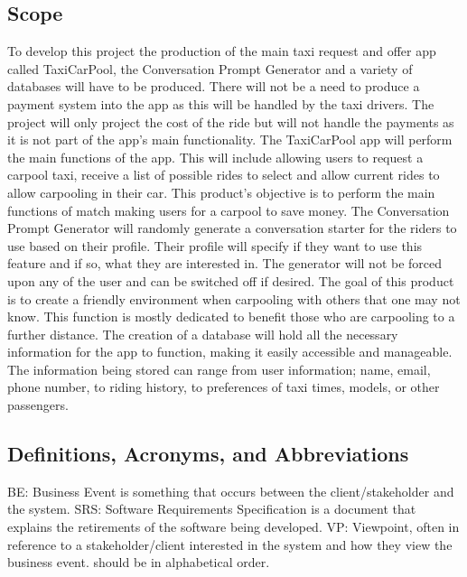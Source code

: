 \documentclass[]{article}
\begin{document}
\subsection{Scope}
\label{sub:scope}
To develop this project the production of the main taxi request and offer app called TaxiCarPool, the Conversation Prompt Generator and a variety of databases will have to be produced. There will not be a need to produce a payment system into the app as this will be handled by the taxi drivers. The project will only project the cost of the ride but will not handle the payments as it is not part of the app’s main functionality.
\newline \newline
The TaxiCarPool app will perform the main functions of the app. This will include allowing users to request a carpool taxi, receive a list of possible rides to select and allow current rides to allow carpooling in their car. This product’s objective is to perform the main functions of match making users for a carpool to save money. 
\newline \newline
The Conversation Prompt Generator will randomly generate a conversation starter for the riders to use based on their profile. Their profile will specify if they want to use this feature and if so, what they are interested in. The generator will not be forced upon any of the user and can be switched off if desired. The goal of this product is to create a friendly environment when carpooling with others that one may not know. This function is mostly dedicated to benefit those who are carpooling to a further distance.
\newline \newline
The creation of a database will hold all the necessary information for the app to function, making it easily accessible and manageable. The information being stored can range from user information; name, email, phone number, to riding history, to preferences of taxi times, models, or other passengers. 

\subsection{Definitions, Acronyms, and Abbreviations}
\label{sub:definitions_acronyms_and_abbreviations}
BE: Business Event is something that occurs between the client/stakeholder and the system. 
\newline \newline
SRS: Software Requirements Specification is a document that explains the retirements of the software being developed.
\newline \newline
VP: Viewpoint, often in reference to a stakeholder/client interested in the system and how they view the business event.  should be in alphabetical order.
\end{document}
